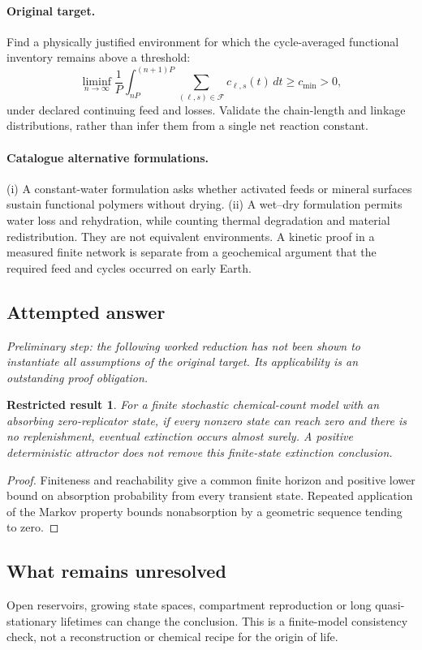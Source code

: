 \documentclass[11pt]{article}
\newtheorem{attemptresult}{Restricted result}[section]
\begin{document}
\paragraph{Original target.}
Find a physically justified environment for which the cycle-averaged functional inventory remains above a threshold:
\[
\liminf_{n\to\infty}\frac1P\int_{nP}^{(n+1)P}
\sum_{(\ell,s)\in\mathcal F}c_{\ell,s}(t)\,dt\geq c_{\min}>0,
\]
under declared continuing feed and losses. Validate the chain-length and linkage distributions, rather than infer them from a single net reaction constant.
\paragraph{Catalogue alternative formulations.}
(i) A constant-water formulation asks whether activated feeds or mineral surfaces sustain functional polymers without drying. (ii) A wet--dry formulation permits water loss and rehydration, while counting thermal degradation and material redistribution. They are not equivalent environments. A kinetic proof in a measured finite network is separate from a geochemical argument that the required feed and cycles occurred on early Earth.
\subsection{Attempted answer}
\noindent\emph{Preliminary step: the following worked reduction has not been shown to instantiate all assumptions of the original target. Its applicability is an outstanding proof obligation.}

\begin{attemptresult}
For a finite stochastic chemical-count model with an absorbing zero-replicator state, if every nonzero state can reach zero and there is no replenishment, eventual extinction occurs almost surely. A positive deterministic attractor does not remove this finite-state extinction conclusion.
\end{attemptresult}
\begin{proof}
Finiteness and reachability give a common finite horizon and positive lower bound on absorption probability from every transient state. Repeated application of the Markov property bounds nonabsorption by a geometric sequence tending to zero.
\end{proof}
\subsection{What remains unresolved}
Open reservoirs, growing state spaces, compartment reproduction or long quasi-stationary lifetimes can change the conclusion. This is a finite-model consistency check, not a reconstruction or chemical recipe for the origin of life.
\end{document}
